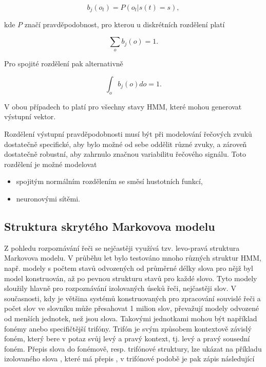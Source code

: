 \begin{equation}
  b_j\left(o_t\right) = P\left(o_t|s\left(t\right)=s\right),
  \label{eq:asr:acoustic:state:output}
\end{equation}

\noindent kde $P$ značí pravděpodobnost, pro kterou u diskrétních rozdělení platí

\begin{equation}
  \sum_o b_j\left(o\right) = 1.
  \label{eq:asr:acoustic:state:output:condition:discrete}
\end{equation}

\noindent Pro spojité rozdělení pak alternativně

\begin{equation}
  \int_o b_j\left(o\right)do = 1.
  \label{eq:asr:acoustic:state:output:condition:continous}
\end{equation}

\noindent V obou případech to platí pro všechny stavy HMM, které mohou generovat výstupní vektor.

Rozdělení výstupní pravděpodobnosti musí být při modelování řečových zvuků dostatečně specifické, aby bylo možné od sebe oddělit různé zvuky, a zároveň dostatečně robustní, aby zahrnulo značnou variabilitu řečového signálu. Toto rozdělení je možné modelovat

\begin{itemize}
  \item spojitým normálním rozdělením se směsí hustotních funkcí,
  \item neuronovými sítěmi.
\end{itemize}

\subsection{Struktura skrytého Markovova modelu}
\label{chap:asr:acoustic:HMM}

Z pohledu rozpoznávání řeči se nejčastěji využívá tzv. levo-pravá struktura Markovova modelu. V průběhu let bylo testováno mnoho různých struktur HMM, např. modely s počtem stavů odvozených od průměrné délky slova pro nějž byl model konstruován, až po pevnou strukturu stavů pro každé slovo. Tyto modely sloužily hlavně pro rozpoznávání izolovaných úseků řeči, nejčastěji slov. V současnosti, kdy je většina systémů konstruovaných pro zpracování souvislé řeči a počet slov ve slovníku může přesahovat 1 milion slov, převažují modely odvozené od menších jednotek, než jsou slova. Takovými jednotkami mohou být například fonémy anebo specifičtější trifóny. Trifón je svým způsobem kontextově závislý foném, který bere v potaz svůj levý a pravý kontext, tj. levý a pravý sousední foném. Přepis slova do fonémově, resp. trifónové struktury, lze ukázat na příkladu izolovaného slova , které má přepis , v trifónové podobě je pak zápis následující

